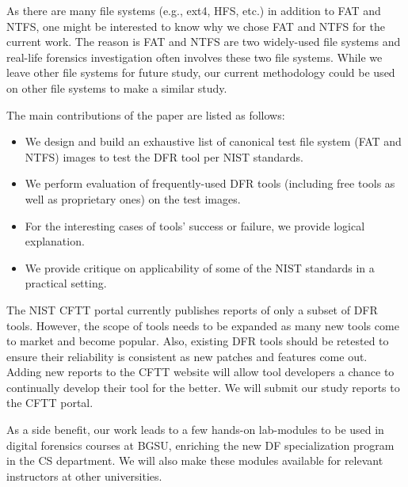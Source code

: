 As there are many file systems (e.g., ext4, HFS, etc.) in addition to FAT and NTFS, one might be interested to know why we chose 
FAT and NTFS for the current work. The reason is FAT and NTFS are two widely-used file systems and 
real-life forensics investigation often involves these two file systems. 
While we leave other file systems for future study, our current methodology could be 
used on other file systems to make a similar study.

The main contributions of the paper are listed as follows:
\begin{itemize}
\item We design and build an exhaustive list of canonical test file system (FAT and NTFS) images to test the DFR tool per NIST standards. 
\item We perform evaluation of frequently-used DFR tools (including free tools as well as proprietary ones) on the test images.
\item For the interesting cases of tools' success or failure, we provide logical explanation.
\item We provide critique on applicability of some of the NIST standards in a practical setting. 
\end{itemize}


The NIST CFTT portal currently publishes reports of only a subset of DFR tools. 
However, the scope of tools needs to be expanded as many new tools come to market and become popular.
Also, existing DFR tools should be retested to ensure their reliability is consistent 
as new patches and features come out. 
Adding new reports to the CFTT website will allow tool developers a 
chance to continually develop their tool for the better. We will submit our study reports to the CFTT portal.

As a side benefit, our work leads to a few hands-on lab-modules to be used in digital forensics courses 
at BGSU, enriching the new DF specialization program in the CS department. We will also make these modules
available for relevant instructors at other universities.
